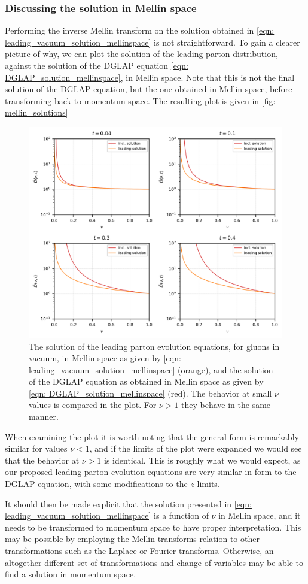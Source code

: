 \documentclass[main.tex]{subfiles}
\begin{document}
\subsubsection*{Discussing the solution in Mellin space}
Performing the inverse Mellin transform on the solution obtained in \autoref{eqn: leading_vacuum_solution_mellinspace} is not straightforward. To gain a clearer picture of why, we can plot the solution of the leading parton distribution, against the solution of the DGLAP equation \autoref{eqn: DGLAP_solution_mellinspace}, in Mellin space. Note that this is not the final solution of the DGLAP equation, but the one obtained in Mellin space, before transforming back to momentum space. The resulting plot is given in \autoref{fig: mellin_solutions} 
\begin{figure}[htb]
    \centering
    \includegraphics[width=12cm]{pictures/plots/misc/mellin_solutions.png}
    \caption{The solution of the leading parton evolution equations, for gluons in vacuum, in Mellin space as given by \autoref{eqn: leading_vacuum_solution_mellinspace} (orange), and the solution of the DGLAP equation as obtained in Mellin space as given by \autoref{eqn: DGLAP_solution_mellinspace} (red). The behavior at small \(\nu\) values is compared in the plot. For \(\nu>1\) they behave in the same manner.}
    \label{fig: mellin_solutions}
\end{figure}

When examining the plot it is worth noting that the general form is remarkably similar for values \(\nu<1\), and if the limits of the plot were expanded we would see that the behavior at \(\nu>1\) is identical. This is roughly what we would expect, as our proposed leading parton evolution equations are very similar in form to the DGLAP equation, with some modifications to the \(z\) limits. 

It should then be made explicit that the solution presented in \autoref{eqn: leading_vacuum_solution_mellinspace} is a function of \(\nu\) in Mellin space, and it needs to be transformed to momentum space to have proper interpretation. This may be possible by employing the Mellin transforms relation to other transformations such as the Laplace or Fourier transforms. Otherwise, an altogether different set of transformations and change of variables may be able to find a solution in momentum space.
\end{document}
